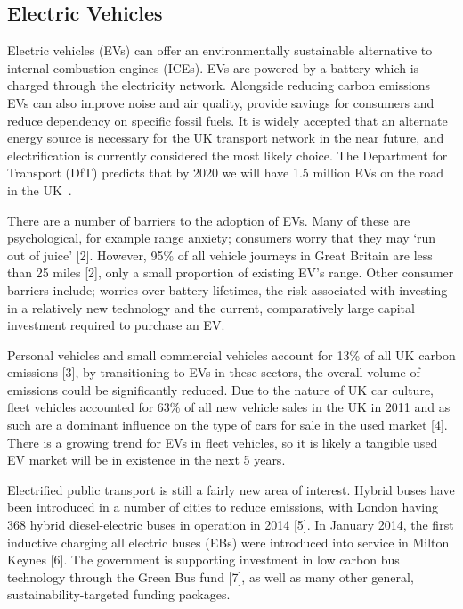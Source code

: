 \documentclass[conference]{IEEEtran}
\begin{document}
\subsection{Electric Vehicles}

Electric vehicles (EVs) can offer an environmentally sustainable
alternative to internal combustion engines (ICEs). EVs are powered by
a battery which is charged through the electricity network. Alongside
reducing carbon emissions EVs can also improve noise and air quality,
provide savings for consumers and reduce dependency on specific fossil
fuels. It is widely accepted that an alternate energy source is
necessary for the UK transport network in the near future, and
electrification is currently considered the most likely choice.  The
Department for Transport (DfT) predicts that by 2020 we will have 1.5
million EVs on the road in the UK~\cite{dft:2008}.

There are a number of barriers to the adoption of EVs. Many of these
are psychological, for example range anxiety; consumers worry that
they may ‘run out of juice’ [2]. However, 95\% of all vehicle journeys
in Great Britain are less than 25 miles [2], only a small proportion
of existing EV’s range. Other consumer barriers include; worries over
battery lifetimes, the risk associated with investing in a relatively
new technology and the current, comparatively large capital investment
required to purchase an EV.

Personal vehicles and small commercial vehicles account for 13\% of
all UK carbon emissions [3], by transitioning to EVs in these sectors,
the overall volume of emissions could be significantly reduced.  Due
to the nature of UK car culture, fleet vehicles accounted for 63\% of
all new vehicle sales in the UK in 2011 and as such are a dominant
influence on the type of cars for sale in the used market [4]. There
is a growing trend for EVs in fleet vehicles, so it is likely a
tangible used EV market will be in existence in the next 5 years.

Electrified public transport is still a fairly new area of
interest. Hybrid buses have been introduced in a number of cities to
reduce emissions, with London having 368 hybrid diesel-electric buses
in operation in 2014 [5]. In January 2014, the first inductive
charging all electric buses (EBs) were introduced into service in
Milton Keynes [6]. The government is supporting investment in low
carbon bus technology through the Green Bus fund [7], as well as many
other general, sustainability-targeted funding packages.
\end{document}
